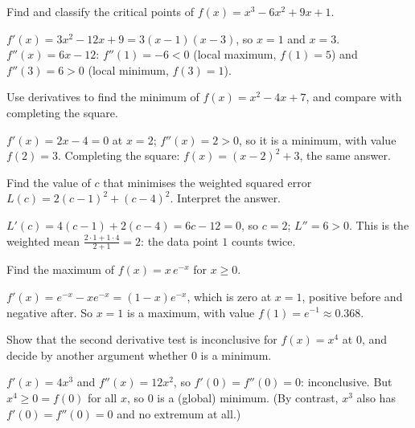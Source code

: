 \sectionexercises

\begin{exercise}
Find and classify the critical points of $f(x) = x^3 - 6x^2 + 9x + 1$.
\end{exercise}
\begin{solution}
$f'(x) = 3x^2 - 12x + 9 = 3(x - 1)(x - 3)$, so $x = 1$ and $x = 3$.
$f''(x) = 6x - 12$: $f''(1) = -6 < 0$ (local maximum, $f(1) = 5$) and
$f''(3) = 6 > 0$ (local minimum, $f(3) = 1$).
\end{solution}

\begin{exercise}
Use derivatives to find the minimum of $f(x) = x^2 - 4x + 7$, and compare with
completing the square.
\end{exercise}
\begin{solution}
$f'(x) = 2x - 4 = 0$ at $x = 2$; $f''(x) = 2 > 0$, so it is a minimum, with
value $f(2) = 3$. Completing the square: $f(x) = (x - 2)^2 + 3$, the same
answer.
\end{solution}

\begin{exercise}
Find the value of $c$ that minimises the weighted squared error
$L(c) = 2(c - 1)^2 + (c - 4)^2$. Interpret the answer.
\end{exercise}
\begin{solution}
$L'(c) = 4(c - 1) + 2(c - 4) = 6c - 12 = 0$, so $c = 2$; $L'' = 6 > 0$. This is
the weighted mean $\tfrac{2\cdot1 + 1\cdot4}{2 + 1} = 2$: the data point $1$
counts twice.
\end{solution}

\begin{exercise}
Find the maximum of $f(x) = x\,e^{-x}$ for $x \ge 0$.
\end{exercise}
\begin{solution}
$f'(x) = e^{-x} - xe^{-x} = (1 - x)e^{-x}$, which is zero at $x = 1$, positive
before and negative after. So $x = 1$ is a maximum, with value
$f(1) = e^{-1} \approx 0.368$.
\end{solution}

\begin{exercise}
Show that the second derivative test is inconclusive for $f(x) = x^4$ at $0$,
and decide by another argument whether $0$ is a minimum.
\end{exercise}
\begin{solution}
$f'(x) = 4x^3$ and $f''(x) = 12x^2$, so $f'(0) = f''(0) = 0$: inconclusive.
But $x^4 \ge 0 = f(0)$ for all $x$, so $0$ is a (global) minimum. (By
contrast, $x^3$ also has $f'(0) = f''(0) = 0$ and no extremum at all.)
\end{solution}

